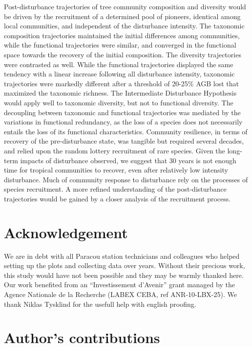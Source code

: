 \documentclass[fleqn,10pt]{ArtEcoFoG} %
\begin{document}
Post-disturbance trajectories of tree community composition and
diversity would be driven by the recruitment of a determined pool of
pioneers, identical among local communities, and independent of the
disturbance intensity. The taxonomic composition trajectories maintained
the initial differences among communities, while the functional
trajectories were similar, and converged in the functional space towards
the recovery of the initial composition. The diversity trajectories were
contrasted as well. While the functional trajectories \color{red}
displayed the same tendency with a linear increase following all
disturbance intensity, \color{black} taxonomic trajectories were
markedly different after a threshold of 20-25\% AGB lost that maximized
the taxonomic richness. The Intermediate Disturbance Hypothesis would
apply well to taxonomic diversity, but not to functional diversity. The
decoupling between taxonomic and functional trajectories was mediated by
the variations in functional redundancy, as the loss of a species does
not necessarily entails the loss of its functional characteristics.
Community resilience, in terms of recovery of the pre-disturbance state,
was tangible but required several decades, and relied upon the random
lottery recruitment of rare species. Given the long-term impacts of
disturbance observed, we suggest that 30 years is not enough time for
tropical communities to recover, even after relatively low intensity
disturbance. Much of community response to disturbance rely on the
processes of species recruitment. A more refined understanding of the
post-disturbance trajectories would be gained by a closer analysis of
the recruitment process.

\section{Acknowledgement}\label{acknowledgement}

We are in debt with all Paracou station technicians and colleagues who
helped setting up the plots and collecting data over years. Without
their precious work, this study would have not been possible and they
may be warmly thanked here. Our work benefited from an ``Investissement
d'Avenir'' grant managed by the Agence Nationale de la Recherche (LABEX
CEBA, ref ANR-10-LBX-25). We thank Niklas Tysklind for the usefull help
with english proofing.

\section{Author's contributions}\label{authors-contributions}
\end{document}
